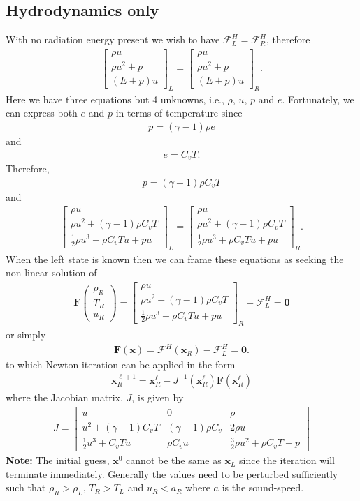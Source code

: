 \documentclass[10pt,letterpaper,notitlepage]{article}
\numberwithin{equation}{section}
\newcommand{\HydroF}{\mathcal{F}^H}
\newcommand{\half}{\frac{1}{2}}
\newcommand{\beq}{\begin{equation*} \begin{aligned}}
\newcommand{\eeq}{\end{aligned}\end{equation*}}
\newcommand{\beqn}{\begin{equation}\begin{aligned}}
\newcommand{\eeqn}{\end{aligned}\end{equation}}
\begin{document}
\begin{appendices}
\subsection{Hydrodynamics only}
With no radiation energy present we wish to have $\HydroF_L = \HydroF_R$, therefore
\beqn 
\begin{bmatrix}
	\rho u \\
	\rho u^2 + p \\
	(E+p)u
\end{bmatrix}_L
=
\begin{bmatrix}
	\rho u \\
	\rho u^2 + p \\
	(E+p)u
\end{bmatrix}_R.
\eeqn 
Here we have three equations but 4 unknowns, i.e., $\rho$, $u$, $p$ and $e$. Fortunately, we can express both $e$ and $p$ in terms of temperature since
\beq 
p = (\gamma-1)\rho e
\eeq 
and
\beq 
e = C_v T.
\eeq
Therefore, 
\beq 
p = (\gamma-1)\rho C_v T
\eeq 
and
\beqn 
\begin{bmatrix}
	\rho u \\
	\rho u^2 + (\gamma-1)\rho C_v T \\
	\half \rho u^3 + \rho C_v T u + pu
\end{bmatrix}_L
=
\begin{bmatrix}
	\rho u \\
	\rho u^2 + (\gamma-1)\rho C_v T \\
	\half \rho u^3 + \rho C_v T u + pu
\end{bmatrix}_R.
\eeqn 
When the left state is known then we can frame these equations as seeking the non-linear solution of
\beqn 
\mathbf{F}
\begin{pmatrix}
	\rho_R \\ T_R \\ u_R
\end{pmatrix}
= 
\begin{bmatrix}
	\rho u \\
	\rho u^2 + (\gamma-1)\rho C_v T \\
	\half \rho u^3 + \rho C_v T u + pu
\end{bmatrix}_R
- 
\HydroF_L = \mathbf{0}
\eeqn 
or simply
\beqn 
\mathbf{F}(\mathbf{x}) = \HydroF(\mathbf{x}_R) - \HydroF_L = \mathbf{0}.
\eeqn 
to which Newton-iteration can be applied in the form
\beq
\mathbf{x}_R^{\ell+1} = \mathbf{x}_R^\ell - J^{-1}(\mathbf{x}_R^\ell) \mathbf{F}(\mathbf{x}_R^\ell)
\eeq 
where the Jacobian matrix, $J$, is given by
\beqn 
J = 
\begin{bmatrix}
	u & 0 & \rho \\
	u^2 + (\gamma-1)C_v T & (\gamma-1)\rho C_v & 2\rho u \\
	\half u^3 + C_v T u  & \rho C_v u & \frac{3}{2}\rho u^2 + \rho C_v T  + p
\end{bmatrix}
\eeqn 
\newline 
\newline
\textbf{Note:} The initial guess, $\mathbf{x}^0$ cannot be the same as $\mathbf{x}_L$ since the iteration will terminate immediately. Generally the values need to be perturbed sufficiently such that $\rho_R > \rho_L$, $T_R > T_L$ and $u_R < a_R$ where $a$ is the sound-speed.


\end{appendices}
\end{document}
